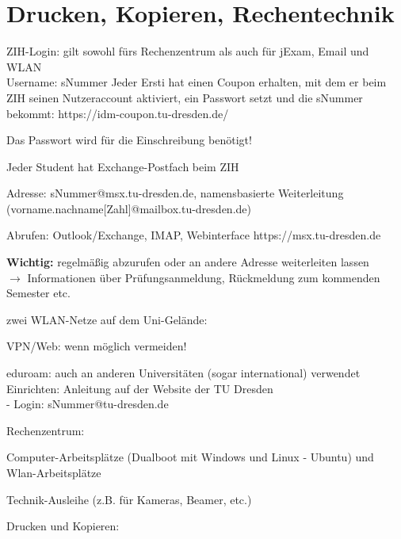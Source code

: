 \documentclass[a4paper,12pt]{report}
\begin{document}
\section{Drucken, Kopieren, Rechentechnik}
\begin{itemize*}
	\item ZIH-Login: gilt sowohl fürs Rechenzentrum als auch für jExam, Email und WLAN\\
			Username: \glqq sNummer\grqq
			Jeder Ersti hat einen Coupon erhalten, mit dem er beim ZIH seinen Nutzeraccount aktiviert, ein Passwort setzt und die sNummer bekommt: https://idm-coupon.tu-dresden.de/
  	\item Das Passwort wird für die Einschreibung benötigt!
	\item Jeder Student hat Exchange-Postfach beim ZIH
	\begin{itemize*}
		\item Adresse: sNummer@msx.tu-dresden.de, namensbasierte Weiterleitung \\(vorname.nachname[Zahl]@mailbox.tu-dresden.de)
		\item Abrufen: Outlook/Exchange, IMAP, Webinterface https://msx.tu-dresden.de
		\item \textbf{Wichtig:} regelmäßig abzurufen oder an andere Adresse weiterleiten lassen\\
		$\rightarrow$ Informationen über Prüfungsanmeldung, Rückmeldung zum kommenden Semester etc.
	\end{itemize*}
	\item zwei WLAN-Netze auf dem Uni-Gelände:
	\begin{itemize*}
		\item VPN/Web: wenn möglich vermeiden!
		\item eduroam: auch an anderen Universitäten (sogar international) verwendet\\
		Einrichten: Anleitung auf der Website der TU Dresden\\
		- Login: sNummer@tu-dresden.de
	\end{itemize*}
	\item Rechenzentrum:
	\begin{itemize*}
		\item Computer-Arbeitsplätze (Dualboot mit Windows und Linux - Ubuntu) und Wlan-Arbeitsplätze
		\item Technik-Ausleihe (z.B. für Kameras, Beamer, etc.)
	\end{itemize*}
	\item Drucken und Kopieren: 

\end{itemize*}
\end{document}
